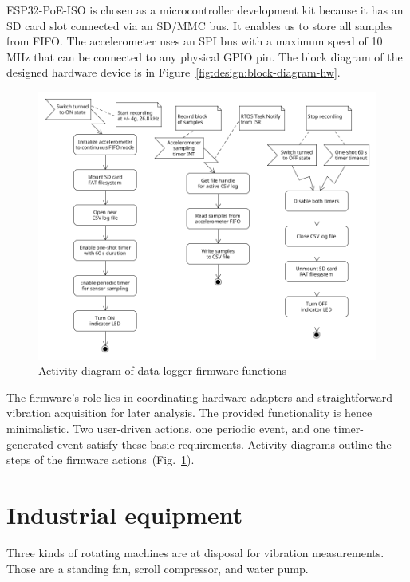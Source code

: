 ESP32-PoE-ISO is chosen as a microcontroller development kit because it has an SD card slot connected via an SD/MMC bus. It enables us to store all samples from FIFO. The accelerometer uses an SPI bus with a maximum speed of 10 MHz that can be connected to any physical GPIO pin. The block diagram of the designed hardware device is in Figure~\ref{fig:design:block-diagram-hw}.

\begin{figure}[h]
    \centering
	\includegraphics[width=\textwidth]{assets/design/firmware-design.png}
	\caption{Activity diagram of data logger firmware functions}
	\label{fig:design:firmware-activity}
\end{figure}

The firmware's role lies in coordinating hardware adapters and straightforward vibration acquisition for later analysis. The provided functionality is hence minimalistic. Two user-driven actions, one periodic event, and one timer-generated event satisfy these basic requirements. Activity diagrams outline the steps of the firmware actions~(Fig.~\ref{fig:design:firmware-activity}).

\section{Industrial equipment}
Three kinds of rotating machines are at disposal for vibration measurements. Those are a standing fan, scroll compressor, and water pump.

